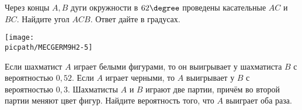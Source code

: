 \begin{class}[number=7]
\begin{listofex}
		\item
		\begin{minipage}[t]{\bodywidth}
			Через концы \(A, B\) дуги окружности в \(62\degree \) проведены касательные \(AC\) и \(BC\). Найдите угол \(ACB\). Ответ дайте в градусах.
		\end{minipage}
		\hspace{0.02\linewidth}
		\begin{minipage}[t]{\picwidth}
			\texttt{[image: \\picpath/MECGERM9H2-5]}
		\end{minipage}
		\newpage
		\item Если шахматист \(A\) играет белыми фигурами, то он выигрывает у шахматиста \(B\) с вероятностью \(0,52\). Если \(A\) играет черными, то \(A\) выигрывает у \(B\) с вероятностью \(0,3\). Шахматисты \(A\) и \(B\) играют две партии, причём во второй партии меняют цвет фигур. Найдите вероятность того, что \(A\) выиграет оба раза.
		
		
		
	\end{listofex}
\end{class}

